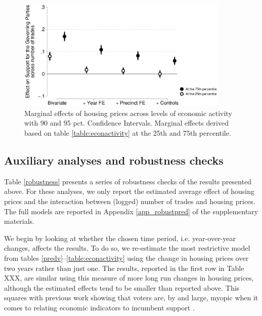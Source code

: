 \documentclass[12pt,a4paper]{article}
\begin{document}
	\begin{figure}[htbp!]
		\includegraphics[width=0.9\textwidth]{../figures/localactivity.eps}
		\centering
		\caption{Marginal effects of housing prices across levels of economic activity with 90 and 95 pct. Confidence Intervals.  Marginal effects derived based on table \ref{table:econactivity} at the 25th and 75th percentile.}\label{localactivity}
	\end{figure}
	
	
	
	\subsection{Auxiliary analyses and robustness checks} \label{inference}
	Table \ref{robustness} presents a series of robustness checks of the results presented above. For these analyses, we only report the estimated average effect of housing prices and the interaction between (logged) number of trades and housing prices. The full models are reported in Appendix \ref{app_robustpred} of the supplementary materials.
	
	
	
	We begin by looking at whether the chosen time period, i.e. year-over-year changes, affects the results. To do so, we re-estimate the most restrictive model from tables \ref{predv}--\ref{table:econactivity} using the change in housing prices over two years rather than just one. The results, reported in the first row in Table XXX, are similar using this measure of more long run changes in housing prices, although the estimated effects tend to be smaller than reported above. This squares with previous work showing that voters are, by and large, myopic when it comes to relating economic indicators to incumbent support \citep{healy2009myopic,healy2014substituting}.
	
\end{document}
